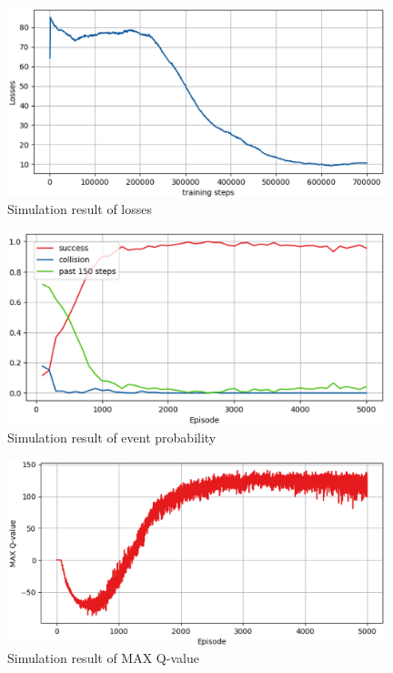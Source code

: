 \documentclass[12pt]{sonota/aislab}
\begin{document}
\begin{figure}[t]
\begin{center}
\includegraphics[clip, width=11cm]{figs/result_multi_loss.eps}
\caption{Simulation result of losses}
\label{result_loss}
\end{center}
\end{figure}

\begin{figure}[t]
\begin{center}
\includegraphics[clip, width=11cm]{figs/result_multi_probability.eps}
\caption{Simulation result of event probability}
\label{result_probability}
\end{center}
\end{figure}

\begin{figure}[t]
\begin{center}
\includegraphics[clip, width=11cm]{figs/result_multi_q_value.eps}
\caption{Simulation result of MAX Q-value}
\label{result_q_value}
\end{center}
\end{figure}
\end{document}
